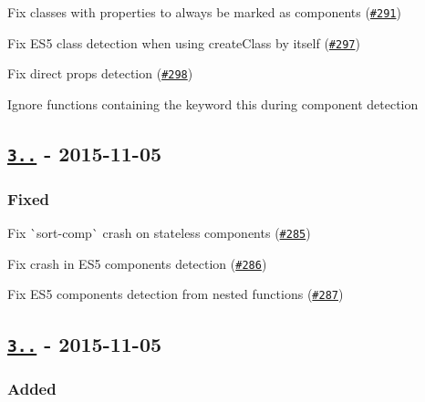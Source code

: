 \begin{DoxyItemize}
\item Fix classes with properties to always be marked as components (\href{https://github.com/yannickcr/eslint-plugin-react/issues/291}{\tt \#291})
\item Fix E\+S5 class detection when using {\ttfamily create\+Class} by itself (\href{https://github.com/yannickcr/eslint-plugin-react/issues/297}{\tt \#297})
\item Fix direct props detection (\href{https://github.com/yannickcr/eslint-plugin-react/issues/298}{\tt \#298})
\item Ignore functions containing the keyword {\ttfamily this} during component detection
\end{DoxyItemize}

\subsection*{\href{https://github.com/yannickcr/eslint-plugin-react/compare/v3.7.0...v3.7.1}{\tt 3..} -\/ 2015-\/11-\/05}

\subsubsection*{Fixed}


\begin{DoxyItemize}
\item Fix \`{}sort-\/comp\`{} crash on stateless components (\href{https://github.com/yannickcr/eslint-plugin-react/issues/285}{\tt \#285})
\item Fix crash in E\+S5 components detection (\href{https://github.com/yannickcr/eslint-plugin-react/issues/286}{\tt \#286})
\item Fix E\+S5 components detection from nested functions (\href{https://github.com/yannickcr/eslint-plugin-react/issues/287}{\tt \#287})
\end{DoxyItemize}

\subsection*{\href{https://github.com/yannickcr/eslint-plugin-react/compare/v3.6.3...v3.7.0}{\tt 3..} -\/ 2015-\/11-\/05}

\subsubsection*{Added}


